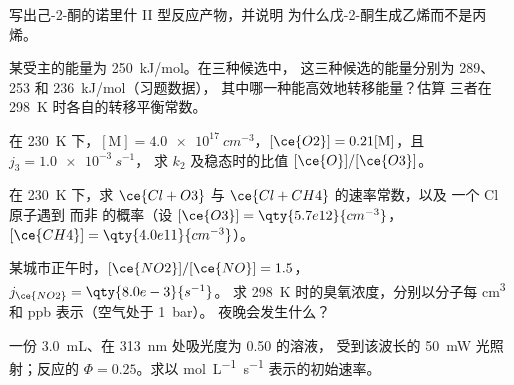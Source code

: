 \begin{exercise}[$\star\star$]\label{exo:b3:photochemistry:6}
写出己-2-酮的诺里什 II 型反应产物，并说明
为什么戊-2-酮生成乙烯而不是丙烯。
\end{exercise}

\begin{exercise}[$\star\star$]\label{exo:b3:photochemistry:7}
某受主的能量为 \qty{250}{kJ/mol}。在三种候选中，
这三种候选的能量分别为 289、253 和 \qty{236}{kJ/mol}（习题数据），
其中哪一种能高效地转移能量？估算
三者在 \qty{298}{K} 时各自的转移平衡常数。
\end{exercise}

\begin{exercise}[$\star\star$]\label{exo:b3:photochemistry:8}
在 \qty{230}{K} 下，$[\mathrm M] = \qty{4.0e17}{cm^{-3}}$，$[\ce{O2}] = 0.21[\mathrm M]$，且 $j_3 = \qty{1.0e-3}{s^{-1}}$，
求 $k_2$ 及稳态时的比值 $[\ce{O}]/[\ce{O3}]$。
\end{exercise}

\begin{exercise}[$\star\star$]\label{exo:b3:photochemistry:9}
在 \qty{230}{K} 下，求 $\ce{Cl + O3}$ 与 $\ce{Cl + CH4}$ 的速率常数，以及
一个 Cl 原子遇到  而非  的概率（设 $[\ce{O3}] = \qty{5.7e12}{cm^{-3}}$，
$[\ce{CH4}] = \qty{4.0e11}{cm^{-3}}$）。
\end{exercise}

\begin{exercise}[$\star\star\star$]\label{exo:b3:photochemistry:10}
某城市正午时，$[\ce{NO2}]/[\ce{NO}] = 1.5$，$j_{\ce{NO2}} = \qty{8.0e-3}{s^{-1}}$。
求 \qty{298}{K} 时的臭氧浓度，分别以分子每 \unit{cm^3} 和 ppb 表示（空气处于 \qty{1}{bar}）。
夜晚会发生什么？
\end{exercise}

\begin{exercise}[$\star\star\star$]\label{exo:b3:photochemistry:11}
一份 \qty{3.0}{mL}、在 \qty{313}{nm} 处吸光度为 0.50 的溶液，
受到该波长的 \qty{50}{mW} 光照射；反应的 $\Phi = 0.25$。求以
\unit{mol.L^{-1}.s^{-1}} 表示的初始速率。
\end{exercise}

